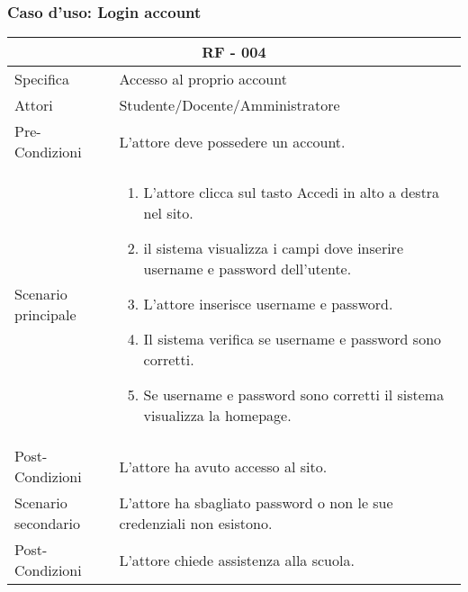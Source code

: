 \documentclass{article}
\begin{document}
\subsubsection{\textbf{Caso d'uso: Login account}}
\begin{tabular}{ |p{3cm}|p{9cm}|  }
	\hline
	\multicolumn{2}{|c|}{\textbf{RF - 004}} \\
	\hline
	Specifica& Accesso al proprio account\\
	\hline
	Attori& Studente/Docente/Amministratore\\
	\hline
	Pre-Condizioni& L'attore deve possedere un account.\\
	\hline
	Scenario principale& \begin{enumerate}
		\item L'attore clicca sul tasto Accedi in alto a destra nel sito.
		\item il sistema visualizza i campi dove inserire username e password dell'utente.
		\item L'attore inserisce username e password.
		\item Il sistema verifica se username e password sono corretti.
		\item Se username e password sono corretti il sistema visualizza la homepage.
	\end{enumerate}\\
	\hline
	Post-Condizioni& L'attore ha avuto accesso al sito.\\
	\hline
	Scenario secondario& L'attore ha sbagliato password o non le sue credenziali non esistono.\\
	\hline
	Post-Condizioni& L'attore chiede assistenza alla scuola.\\
	\hline
\end{tabular}
\end{document}
